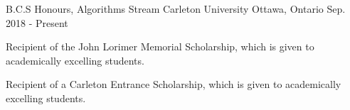 



\begin{cventries}

  \cventry
    {B.C.S Honours, Algorithms Stream} %
    {Carleton University} %
    {Ottawa, Ontario} %
    {Sep. 2018 - Present} %
    {
      \begin{cvitems} %
        \item {Recipient of the John Lorimer Memorial Scholarship, which is given to academically excelling students.}
        \item {Recipient of a Carleton Entrance Scholarship, which is given to academically excelling students.}
      \end{cvitems}
    }
    
\end{cventries}

